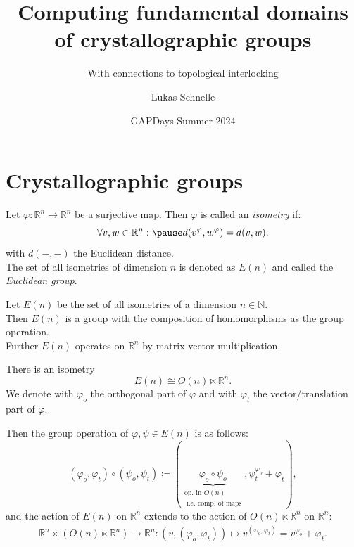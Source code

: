 \documentclass{beamer}
\title{Computing fundamental domains of crystallographic groups}
\subtitle{With connections to topological interlocking}
\author{Lukas Schnelle}
\date{GAPDays Summer 2024}
\theoremstyle{plain}
\newcommand\R{\mathbb R}
\newcommand\N{\mathbb N}
\renewcommand{\phi}{\varphi}
\begin{document}
\frame[plain]{\titlepage}

\section{Crystallographic groups}

\begin{frame}
    \begin{definition}[Isometry]\label{def:isometry}
        Let $\phi:\R^n \to \R^n$ be a surjective map. 
        Then $\phi$ is called an \emph{isometry} if:
        $$
            \forall v, w \in \R^n : \pause d(v^\phi, w^\phi) = d(v,w).
        $$
        with $d(-,-)$ the Euclidean distance.\\ \pause 
        The set of all isometries of dimension $n$ is denoted as $E(n)$ and called the \emph{Euclidean group}.
    \end{definition}
    \pause
    \begin{lemma}\label{lma:isom-is-grp}
        Let $E(n)$ be the set of all isometries of a dimension $n \in \N$. \\ \pause
        Then $E(n)$ is a group with the composition of homomorphisms as the group operation. \\
        Further $E(n)$ operates on $\R^n$ by matrix vector multiplication.
    \end{lemma}
\end{frame}

\begin{frame}
    \begin{proposition}
        There is an isometry
        $$
            E(n) \cong O(n) \ltimes \R^n.
        $$
        We denote with $\phi_o$ the orthogonal part of $\phi$ and with $\phi_t$ the vector/translation part of $\phi$.
    \end{proposition}

    Then the group operation of $\phi, \psi \in E(n)$ is as follows:\pause
    $$
        (\phi_o, \phi_t) \circ (\psi_o, \psi_t) \coloneqq (\underbrace{\phi_o \circ \psi_o}_{\substack{\text{op. in }O(n)\\ \text{ i.e. comp. of maps}}}, \psi_t^{\phi_o} + \phi_t),
    $$\pause
    and the action of $E(n)$ on $\R^n$ extends to the action of $O(n) \ltimes \R^n$ on $\R^n$:\pause
    \begin{align*} \label{align:semidirect-action}
        \R^n \times ( O(n) \ltimes \R^n) \to \R^n: (v, (\phi_o, \phi_t)) \mapsto v^{(\phi_o, \phi_t)} = v^{\phi_o} + \phi_t.
    \end{align*}
\end{frame}
\end{document}
